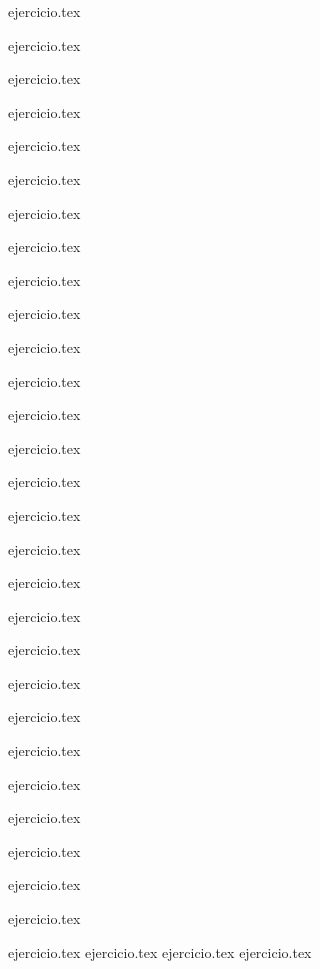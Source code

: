 \begin{enumerate}
    \begin{minipage}{0.45\textwidth}
    \setcounter{enumi}{14}
    {ejercicio.tex}
    \addtocounter{enumi}{1}
    {ejercicio.tex}
    \addtocounter{enumi}{1}
    {ejercicio.tex}
    \addtocounter{enumi}{1}
    {ejercicio.tex}
    \addtocounter{enumi}{1}
    {ejercicio.tex}
    \addtocounter{enumi}{1}
    {ejercicio.tex}
    \addtocounter{enumi}{1}
    {ejercicio.tex}
    \addtocounter{enumi}{1}
    {ejercicio.tex}
    \addtocounter{enumi}{1}
    {ejercicio.tex}
    \addtocounter{enumi}{1}
    {ejercicio.tex}
    \addtocounter{enumi}{1}
    {ejercicio.tex}
    \addtocounter{enumi}{1}
    {ejercicio.tex}
    \addtocounter{enumi}{1}
    {ejercicio.tex}
    \addtocounter{enumi}{1}
    {ejercicio.tex}
    \end{minipage}%
    \begin{minipage}{0.45\textwidth}
    \setcounter{enumi}{28}
    {ejercicio.tex}
    \addtocounter{enumi}{1}
    {ejercicio.tex}
    \addtocounter{enumi}{1}
    {ejercicio.tex}
    \addtocounter{enumi}{1}
    {ejercicio.tex}
    \addtocounter{enumi}{1}
    {ejercicio.tex}
    \addtocounter{enumi}{1}
    {ejercicio.tex}
    \addtocounter{enumi}{1}
    {ejercicio.tex}
    \addtocounter{enumi}{1}
    {ejercicio.tex}
    \addtocounter{enumi}{1}
    {ejercicio.tex}
    \addtocounter{enumi}{1}
    {ejercicio.tex}
    \addtocounter{enumi}{1}
    {ejercicio.tex}
    \addtocounter{enumi}{1}
    {ejercicio.tex}
    \addtocounter{enumi}{1}
    {ejercicio.tex}
    \addtocounter{enumi}{1}
    {ejercicio.tex}
    \end{minipage}
\end{enumerate}

\begin{enumerate}
    {ejercicio.tex}
    {ejercicio.tex}
    {ejercicio.tex}
    {ejercicio.tex}
\end{enumerate}

